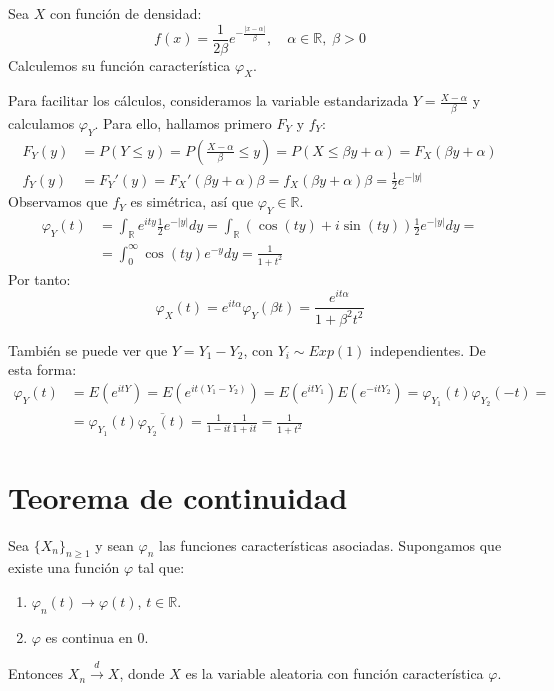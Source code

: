 \begin{exercise}
    Sea $X$ con función de densidad:
    $$f(x) = \frac{1}{2\beta}e^{-\frac{|x-\alpha|}{\beta}}, \quad \alpha \in \mathbb{R}, \; \beta > 0$$
    Calculemos su función característica $\varphi_X$.

    Para facilitar los cálculos, consideramos la variable estandarizada $Y = \frac{X-\alpha}{\beta}$ y calculamos $\varphi_Y$.
    Para ello, hallamos primero $F_Y$ y $f_Y$:
    \begin{align*}
        F_Y(y) & = P(Y \leq y) = P\left(\frac{X-\alpha}{\beta} \leq y\right) = P(X \leq \beta y + \alpha) = F_X(\beta y + \alpha) \\
        f_Y(y) & = F_Y'(y) = F_X'(\beta y + \alpha)\beta = f_X(\beta y + \alpha)\beta = \frac{1}{2}e^{-|y|}
    \end{align*}
    Observamos que $f_Y$ es simétrica, así que $\varphi_Y \in \mathbb{R}$.
    \begin{align*}
        \varphi_Y(t) & = \int_\mathbb{R} e^{ity}\frac{1}{2}e^{-|y|}dy = \int_\mathbb{R} (\cos(ty) + i\sin(ty))\frac{1}{2}e^{-|y|}dy = \\
                     & = \int_0^\infty \cos(ty)e^{-y}dy = \frac{1}{1+t^2}
    \end{align*}
    Por tanto:
    $$\varphi_X(t) = e^{it\alpha}\varphi_Y(\beta t) = \frac{e^{it\alpha}}{1+\beta^2t^2}$$

    También se puede ver que $Y = Y_1 - Y_2$, con $Y_i \sim Exp(1)$ independientes.
    De esta forma:
    \begin{align*}
        \varphi_Y(t) & = E(e^{itY}) = E(e^{it(Y_1-Y_2)}) = E(e^{itY_1})E(e^{-itY_2}) = \varphi_{Y_1}(t)\varphi_{Y_2}(-t) = \\
                     & = \varphi_{Y_1}(t) \overline{\varphi_{Y_2}(t)} = \frac{1}{1-it}\frac{1}{1+it} = \frac{1}{1+t^2}
    \end{align*}
\end{exercise}

\section{Teorema de continuidad}
\begin{theorem}
    Sea $\{X_n\}_{n \geq 1}$ y sean $\varphi_n$ las funciones características asociadas.
    Supongamos que existe una función $\varphi$ tal que:
    \begin{enumerate}
        \item $\varphi_n(t) \to \varphi(t)$, $t \in \mathbb{R}$.
        \item $\varphi$ es continua en 0.
    \end{enumerate}
    Entonces $X_n \xrightarrow{d} X$, donde $X$ es la variable aleatoria con función característica $\varphi$.
\end{theorem}

